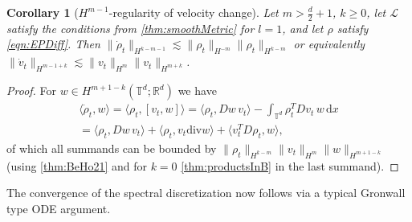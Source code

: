 \documentclass[a4paper, 12pt]{article}
\newtheorem{corollary}[theorem]{Corollary}
\newcommand{\R}{\mathbb{R}}
\newcommand{\T}{\mathbb{T}}
\renewcommand{\d}{\mathrm{d}}
\renewcommand{\div}{\mathrm{div}}
\renewcommand{\L}{\mathcal{L}}
\begin{document}
\begin{corollary}[$H^{m-1}$-regularity of velocity change]\label{thm:rhsRegularity}
Let $m\!>\!\frac d2\!+\!1$, $k\!\geq\!0$, let $\L$ satisfy the conditions from \cref{thm:smoothMetric} for $l=1$, and let $\rho$ satisfy \eqref{eqn:EPDiff}.
Then $\|\dot\rho_t\|_{H^{k-m-1}}\lesssim\|\rho_t\|_{H^{-m}}\|\rho_t\|_{H^{k-m}}$ or equivalently $\|\dot v_t\|_{H^{m-1+k}}\lesssim\|v_t\|_{H^{m}}\|v_t\|_{H^{m+k}}$.
\end{corollary}
\begin{proof}
For $w\in H^{m+1-k}(\T^d;\R^d)$ we have
\begin{multline*}
\langle\dot\rho_t,w\rangle
=\langle\rho_t,[v_t,w]\rangle
=\langle\rho_t,Dw\,v_t\rangle-\int_{\T^d}\rho_t^TDv_t\,w\,\d x\\
=\langle\rho_t,Dw\,v_t\rangle+\langle\rho_t,v_t\div w\rangle+\langle v_t^TD\rho_t,w\rangle,
\end{multline*}
of which all summands can be bounded by $\|\rho_t\|_{H^{k-m}}\|v_t\|_{H^m}\|w\|_{H^{m+1-k}}$
(using \cref{thm:BeHo21} and for $k=0$ \cref{thm:productsInB} in the last summand).
\end{proof}

The convergence of the spectral discretization now follows via a typical Gronwall type ODE argument.
\end{document}
